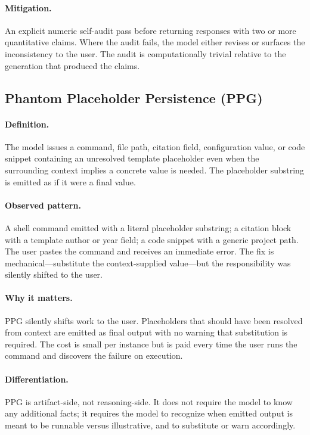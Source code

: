 \documentclass[11pt]{article}
\begin{document}
\paragraph{Mitigation.} An explicit numeric self-audit pass before returning responses with two or more quantitative claims. Where the audit fails, the model either revises or surfaces the inconsistency to the user. The audit is computationally trivial relative to the generation that produced the claims.

\subsection{Phantom Placeholder Persistence (PPG)}
\paragraph{Definition.} The model issues a command, file path, citation field, configuration value, or code snippet containing an unresolved template placeholder even when the surrounding context implies a concrete value is needed. The placeholder substring is emitted as if it were a final value.

\paragraph{Observed pattern.} A shell command emitted with a literal placeholder substring; a citation block with a template author or year field; a code snippet with a generic project path. The user pastes the command and receives an immediate error. The fix is mechanical---substitute the context-supplied value---but the responsibility was silently shifted to the user.

\paragraph{Why it matters.} PPG silently shifts work to the user. Placeholders that should have been resolved from context are emitted as final output with no warning that substitution is required. The cost is small per instance but is paid every time the user runs the command and discovers the failure on execution.

\paragraph{Differentiation.} PPG is artifact-side, not reasoning-side. It does not require the model to know any additional facts; it requires the model to recognize when emitted output is meant to be runnable versus illustrative, and to substitute or warn accordingly.
\end{document}
